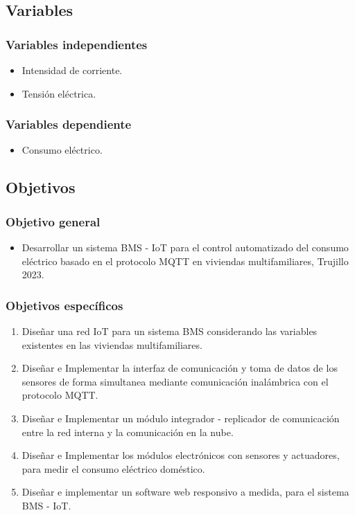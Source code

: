 \documentclass[a4paper, 12pt]{article}
\begin{document}
\subsection{Variables}

\vskip 0.2cm  
\subsubsection{Variables independientes}

\begin{itemize}
\item Intensidad de corriente.
\item Tensión eléctrica.
\end{itemize}

\subsubsection{Variables dependiente}
\begin{itemize}
\item Consumo eléctrico.
\end{itemize}

\subsection{Objetivos}

\vskip 0.2cm 
\subsubsection{Objetivo general}
\begin{itemize}
\item Desarrollar un sistema BMS - IoT para el control automatizado del consumo eléctrico basado en el protocolo MQTT en viviendas multifamiliares, Trujillo 2023.
\end{itemize}

\subsubsection{Objetivos específicos}
\begin{enumerate}
\item Diseñar una red IoT para un sistema BMS considerando las variables existentes en las viviendas multifamiliares.
\item Diseñar e Implementar la interfaz de comunicación y toma de datos de los sensores de forma simultanea mediante comunicación inalámbrica con el protocolo MQTT.
\item Diseñar e Implementar un módulo integrador - replicador de comunicación entre la red interna y la comunicación en la nube.
\item Diseñar e Implementar los módulos electrónicos con sensores y actuadores, para medir el consumo eléctrico doméstico.
\item Diseñar e implementar un software web responsivo a medida, para el sistema BMS - IoT.
\end{enumerate}
\end{document}
